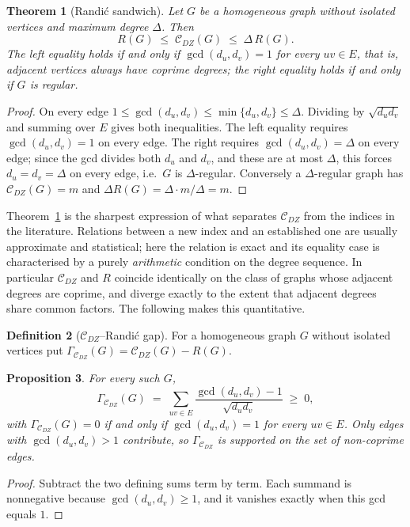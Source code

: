 \documentclass[11pt,a4paper]{article}
\theoremstyle{plain}
\newtheorem{theorem}{Theorem}[section]
\newtheorem{proposition}[theorem]{Proposition}
\theoremstyle{definition}
\newtheorem{definition}[theorem]{Definition}
\theoremstyle{remark}
\newcommand{\CDZ}{\mathcal{C}_{DZ}}
\newcommand{\gcdd}{\operatorname{gcd}}
\begin{document}
\begin{theorem}[Randi\'c sandwich]
\label{thm:randic}
Let $G$ be a homogeneous graph without isolated vertices and maximum degree
$\Delta$. Then
\[
  R(G) \;\le\; \CDZ(G) \;\le\; \Delta\,R(G).
\]
The left equality holds if and only if $\gcdd(d_u,d_v)=1$ for every $uv\in E$,
that is, adjacent vertices always have coprime degrees; the right equality holds
if and only if $G$ is regular.
\end{theorem}

\begin{proof}
On every edge $1\le\gcdd(d_u,d_v)\le\min\{d_u,d_v\}\le\Delta$. Dividing by
$\sqrt{d_ud_v}$ and summing over $E$ gives both inequalities. The left equality
requires $\gcdd(d_u,d_v)=1$ on every edge. The right requires
$\gcdd(d_u,d_v)=\Delta$ on every edge; since the gcd divides both $d_u$ and
$d_v$, and these are at most $\Delta$, this forces $d_u=d_v=\Delta$ on every
edge, i.e.\ $G$ is $\Delta$-regular. Conversely a $\Delta$-regular graph has
$\CDZ(G)=m$ and $\Delta R(G)=\Delta\cdot m/\Delta=m$.
\end{proof}

Theorem~\ref{thm:randic} is the sharpest expression of what separates $\CDZ$
from the indices in the literature. Relations between a new index and an
established one are usually approximate and statistical; here the relation is
exact and its equality case is characterised by a purely \emph{arithmetic}
condition on the degree sequence. In particular $\CDZ$ and $R$ coincide
identically on the class of graphs whose adjacent degrees are coprime, and
diverge exactly to the extent that adjacent degrees share common factors. The
following makes this quantitative.

\begin{definition}[$\CDZ$--Randi\'c gap]
\label{def:gap}
For a homogeneous graph $G$ without isolated vertices put
$\Gamma_{\CDZ}(G)=\CDZ(G)-R(G)$.
\end{definition}

\begin{proposition}
\label{prop:gap}
For every such $G$,
\[
  \Gamma_{\CDZ}(G) \;=\; \sum_{uv\in E}\frac{\gcdd(d_u,d_v)-1}{\sqrt{d_ud_v}}
  \;\ge\;0,
\]
with $\Gamma_{\CDZ}(G)=0$ if and only if $\gcdd(d_u,d_v)=1$ for every $uv\in E$.
Only edges with $\gcdd(d_u,d_v)>1$ contribute, so $\Gamma_{\CDZ}$ is supported
on the set of \emph{non-coprime} edges.
\end{proposition}

\begin{proof}
Subtract the two defining sums term by term. Each summand is nonnegative
because $\gcdd(d_u,d_v)\ge1$, and it vanishes exactly when this gcd equals $1$.
\end{proof}
\end{document}
